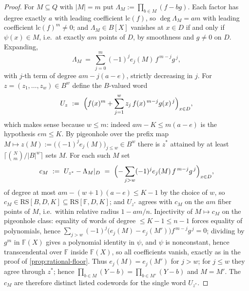 \documentclass[11pt]{article}
\theoremstyle{definition}
\theoremstyle{remark}
\newcommand{\F}{\mathbb{F}}
\newcommand{\B}{B}
\newcommand{\RS}{\mathrm{RS}}
\begin{document}
\begin{proof}
For $M\subseteq Q$ with $|M|=m$ put $\Lambda_M:=\prod_{b\in M}(f-bg)$. Each factor has degree exactly $a$ with leading coefficient $\mathrm{lc}(f)$, so $\deg\Lambda_M=am$ with leading coefficient $\mathrm{lc}(f)^m\ne0$; and $\Lambda_M\in\B[X]$ vanishes at $x\in D$ if and only if $\psi(x)\in M$, i.e.\ at exactly $am$ points of $D$, by smoothness and $g\ne0$ on $D$. Expanding,
\[
\Lambda_M\ =\ \sum_{j=0}^{m}(-1)^je_j(M)\,f^{\,m-j}g^{\,j},
\]
with $j$-th term of degree $am-j(a-e)$, strictly decreasing in $j$. For $z=(z_1,\dots,z_w)\in\B^w$ define the $\B$-valued word
\[
U_z\ :=\ \Bigl(f(x)^m+\sum_{j=1}^{w}z_j\,f(x)^{\,m-j}g(x)^{\,j}\Bigr)_{x\in D},
\]
which makes sense because $w\le m$: indeed $am-K\le m(a-e)$ is the hypothesis $em\le K$. By pigeonhole over the prefix map $M\mapsto z(M):=\bigl((-1)^je_j(M)\bigr)_{j\le w}\in\B^w$ there is $z^*$ attained by at least $\lceil\binom Nm/|\B|^w\rceil$ sets $M$. For each such $M$ set
\[
c_M\ :=\ U_{z^*}-\Lambda_M|_D\ =\ \Bigl(-\sum_{j>w}(-1)^je_j(M)\,f^{\,m-j}g^{\,j}\Bigr)_{x\in D},
\]
of degree at most $am-(w+1)(a-e)\le K-1$ by the choice of $w$, so $c_M\in\RS[\B,D,K]\subseteq\RS[\F,D,K]$; and $U_{z^*}$ agrees with $c_M$ on the $am$ fiber points of $M$, i.e.\ within relative radius $1-am/n$. Injectivity of $M\mapsto c_M$ on the pigeonhole class: equality of words of degree $\le K-1\le n-1$ forces equality of polynomials, hence $\sum_{j>w}(-1)^j\bigl(e_j(M)-e_j(M')\bigr)f^{\,m-j}g^{\,j}=0$; dividing by $g^m$ in $\F(X)$ gives a polynomial identity in $\psi$, and $\psi$ is nonconstant, hence transcendental over $\F$ inside $\F(X)$, so all coefficients vanish, exactly as in the proof of \cref{prop:rational-floor}. Thus $e_j(M)=e_j(M')$ for $j>w$; for $j\le w$ they agree through $z^*$; hence $\prod_{b\in M}(Y-b)=\prod_{b\in M'}(Y-b)$ and $M=M'$. The $c_M$ are therefore distinct listed codewords for the single word $U_{z^*}$.
\end{proof}
\end{document}
